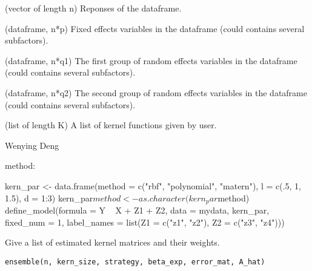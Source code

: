 \documentclass[a4paper]{book}
\begin{document}
\begin{Value}
\begin{ldescription}
\item[\code{Y}] (vector of length n) Reponses of the dataframe.

\item[\code{X}] (dataframe, n*p) Fixed effects variables in the dataframe (could
contains several subfactors).

\item[\code{Z1}] (dataframe, n*q1) The first group of random effects variables in
the dataframe (could contains several subfactors).

\item[\code{Z2}] (dataframe, n*q2) The second group of random effects variables in
the dataframe (could contains several subfactors).

\item[\code{kern\_list}] (list of length K) A list of kernel functions given by
user.
\end{ldescription}
\end{Value}
%
\begin{Author}\relax
Wenying Deng
\end{Author}
%
\begin{SeeAlso}\relax
method: 
\end{SeeAlso}
%
\begin{Examples}
\begin{ExampleCode}



kern_par <- data.frame(method = c("rbf", "polynomial", "matern"), 
l = c(.5, 1, 1.5), d = 1:3)
kern_par$method <- as.character(kern_par$method)
define_model(formula = Y ~ X + Z1 + Z2, data = mydata, kern_par, 
fixed_num = 1, label_names = list(Z1 = c("z1", "z2"), Z2 = c("z3", "z4")))



\end{ExampleCode}
\end{Examples}
%
\begin{Description}\relax
Give a list of estimated kernel matrices and their weights.
\end{Description}
%
\begin{Usage}
\begin{verbatim}
ensemble(n, kern_size, strategy, beta_exp, error_mat, A_hat)
\end{verbatim}
\end{Usage}
\end{document}
